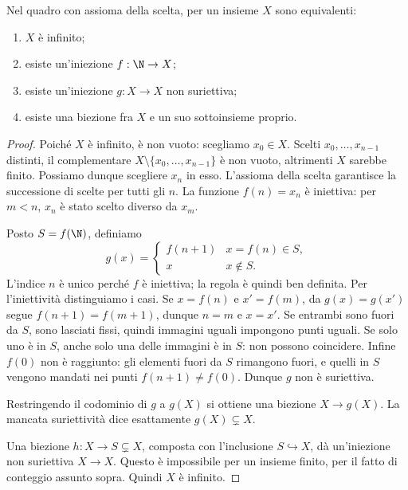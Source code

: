 \begin{teorema}\label{teo:infiniti}
Nel quadro con assioma della scelta, per un insieme $X$ sono equivalenti:
\begin{enumerate}[label=\arabic*.]
\item $X$ è infinito;
\item esiste un'iniezione $f:\N\to X$;
\item esiste un'iniezione $g:X\to X$ non suriettiva;
\item esiste una biezione fra $X$ e un suo sottoinsieme proprio.
\end{enumerate}
\end{teorema}
\begin{proof}
 Poiché $X$ è infinito, è non vuoto: scegliamo $x_0\in X$. Scelti $x_0,\ldots,x_{n-1}$ distinti, il complementare $X\setminus\{x_0,\ldots,x_{n-1}\}$ è non vuoto, altrimenti $X$ sarebbe finito. Possiamo dunque scegliere $x_n$ in esso. L'assioma della scelta garantisce la successione di scelte per tutti gli $n$. La funzione $f(n)=x_n$ è iniettiva: per $m<n$, $x_n$ è stato scelto diverso da $x_m$.

 Posto $S=f(\N)$, definiamo
\[
g(x)=\begin{cases}f(n+1)&x=f(n)\in S,\\x&x\notin S.\end{cases}
\]
L'indice $n$ è unico perché $f$ è iniettiva; la regola è quindi ben definita. Per l'iniettività distinguiamo i casi. Se $x=f(n)$ e $x'=f(m)$, da $g(x)=g(x')$ segue $f(n+1)=f(m+1)$, dunque $n=m$ e $x=x'$. Se entrambi sono fuori da $S$, sono lasciati fissi, quindi immagini uguali impongono punti uguali. Se solo uno è in $S$, anche solo una delle immagini è in $S$: non possono coincidere. Infine $f(0)$ non è raggiunto: gli elementi fuori da $S$ rimangono fuori, e quelli in $S$ vengono mandati nei punti $f(n+1)\ne f(0)$. Dunque $g$ non è suriettiva.

 Restringendo il codominio di $g$ a $g(X)$ si ottiene una biezione $X\to g(X)$. La mancata suriettività dice esattamente $g(X)\subsetneq X$.

 Una biezione $h:X\to S\subsetneq X$, composta con l'inclusione $S\hookrightarrow X$, dà un'iniezione non suriettiva $X\to X$. Questo è impossibile per un insieme finito, per il fatto di conteggio assunto sopra. Quindi $X$ è infinito.
\end{proof}

